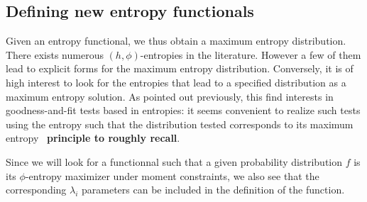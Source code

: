 \documentclass[english,sort&compress]{elsarticle}
\theoremstyle{definition}
\theoremstyle{plain}
\theoremstyle{plain}
\begin{document}

\subsection{Defining new entropy functionals}
\label{subsec:NewPhiEnt}

Given  an entropy  functional, we  thus obtain  a maximum  entropy distribution.
There exists numerous  $(h,\phi)$-entropies in the literature. However  a few of
them lead to  explicit forms for the maximum  entropy distribution.  Conversely,
it  is of  high interest  to look  for the  entropies that  lead to  a specified
distribution as a maximum entropy solution. As pointed out previously, this find
interests in goodness-and-fit  tests based in entropies: it  seems convenient to
realize  such  tests  using  the  entropy  such  that  the  distribution  tested
corresponds  to  its maximum  entropy~\cite{Vas76,  Gok83, Girardin}  {\bf\large
  principle to roughly recall}.

Since we will look for a  functionnal such that a given probability distribution
$f$ is its  $\phi$-entropy maximizer under moment constraints,  we also see that
the corresponding  $\lambda_i$ parameters can  be included in the  definition of
the function.
\end{document}
